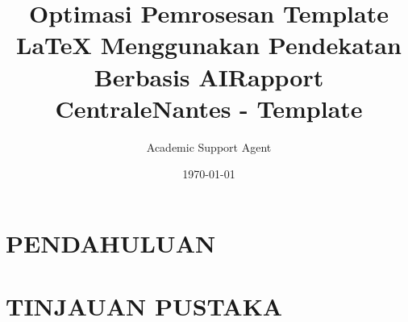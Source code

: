 \documentclass{rapportCS}
\title{Optimasi Pemrosesan Template LaTeX Menggunakan Pendekatan Berbasis AI}
\author{Academic Support Agent}
\date{\today}
\begin{document}
\maketitle

\begin{abstract}

\end{abstract}

\chapter{PENDAHULUAN}


\chapter{TINJAUAN PUSTAKA}


\usepackage{lipsum}
\title{Rapport CentraleNantes - Template} %
\end{document}
